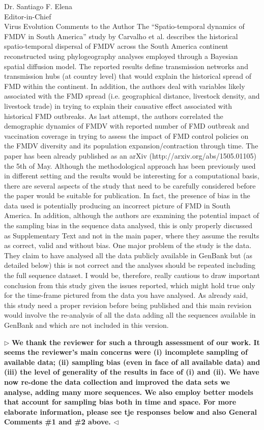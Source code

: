 \documentclass[12pt, a4paper]{letter} %
\newenvironment{reply}{$\triangleright$\bf}{$\triangleleft$}
\begin{document}
\begin{letter}{
	Dr. Santiago F. Elena\\
    Editor-in-Chief \\
    Virus Evolution
}
Comments to the Author
The ``Spatio-temporal dynamics of FMDV in South America'' study by Carvalho et al. describes the historical spatio-temporal dispersal of FMDV across the South America continent reconstructed using phylogeography analyses employed through a Bayesian spatial diffusion model. 
The reported results define transmission networks and transmission hubs (at country level) that would explain the historical spread of FMD within the continent. 
In addition, the authors deal with variables likely associated with the FMD spread (i.e. geographical distance, livestock density, and livestock trade) in trying to explain their causative effect associated with historical FMD outbreaks. 
As last attempt, the authors correlated the demographic dynamics of FMDV with reported number of FMD outbreak and vaccination coverage in trying to assess the impact of FMD control policies on the FMDV diversity and its population expansion/contraction through time. 
The paper has been already published as an arXiv (http://arxiv.org/abs/1505.01105) the 5th of May. 
Although the methodological approach has been previously used in different setting and the results would be interesting for a computational basis, there are several aspects of the study that need to be carefully considered before the paper would be suitable for publication. 
In fact, the presence of bias in the data used is potentially producing an incorrect picture of FMD in South America. 
In addition, although the authors are examining the potential impact of the sampling bias in the sequence data analysed, this is only properly discussed as Supplementary Text and not in the main paper, where they assume the results as correct, valid and without bias. 
One major problem of the study is the data. 
They claim to have analysed all the data publicly available in GenBank but (as detailed below) this is not correct and the analyses should be repeated including the full sequence dataset. 
I would be, therefore, really cautious to draw important conclusion from this study given the issues reported, which might hold true only for the time-frame pictured from the data you have analysed. 
As already said, this study need a proper revision before being published and this main revision would involve the re-analysis of all the data adding all the sequences available in GenBank and which are not included in this version.

\begin{reply}
We thank the reviewer for such a through assessment of our work.
It seems the reviewer's main concerns were (i) incomplete sampling of available data; (ii) sampling bias (even in face of all available data) and (iii) the level of generality of the results in face of (i) and (ii).
We have now re-done the data collection and improved the data sets we analyse, adding many more sequences. %
We also employ better models that account for sampling bias both in time and space.
For more elaborate information, please see tje responses below and also General Comments \#1 and \#2 above.
\end{reply}


\end{letter}
\end{document}
